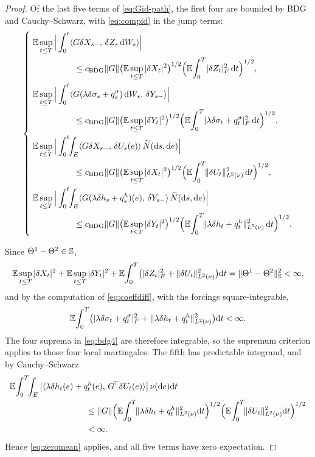 \begin{proof}
Of the last five terms of \eqref{eq:Gid-path}, the first four are bounded by BDG and
Cauchy--Schwarz, with \eqref{eq:compid} in the jump terms:
\begin{equation}\label{eq:bdg4}
\left\{\;
\begin{aligned}
&\E\sup_{t\le T}\Big|\int_0^t\inner{G\delta X_{s-}}{\delta Z_s\,\diff W_s}\Big|\\
&\hspace{0.14\linewidth}\le c_{\mathrm{BDG}}\|G\|\big(\E\sup_{t\le T}|\delta X_t|^2\big)^{1/2}
\Big(\E\!\int_0^T\!|\delta Z_t|_F^2\,\diff t\Big)^{1/2},\\
&\E\sup_{t\le T}\Big|\int_0^t\inner{G(\lambda\delta\sigma_s+q^\sigma_s)\,\diff W_s}{\delta Y_{s-}}\Big|\\
&\hspace{0.14\linewidth}\le c_{\mathrm{BDG}}\|G\|\big(\E\sup_{t\le T}|\delta Y_t|^2\big)^{1/2}
\Big(\E\!\int_0^T\!|\lambda\delta\sigma_t+q^\sigma_t|_F^2\,\diff t\Big)^{1/2},\\
&\E\sup_{t\le T}\Big|\int_0^t\!\!\int_E\inner{G\delta X_{s-}}{\delta U_s(e)}\,\Nt(\diff s,\diff e)\Big|\\
&\hspace{0.14\linewidth}\le c_{\mathrm{BDG}}\|G\|\big(\E\sup_{t\le T}|\delta X_t|^2\big)^{1/2}
\Big(\E\!\int_0^T\!\Lnorm{\delta U_t}^2\,\diff t\Big)^{1/2},\\
&\E\sup_{t\le T}\Big|\int_0^t\!\!\int_E\inner{G(\lambda\delta h_s+q^h_s)(e)}{\delta Y_{s-}}\,\Nt(\diff s,\diff e)\Big|\\
&\hspace{0.14\linewidth}\le c_{\mathrm{BDG}}\|G\|\big(\E\sup_{t\le T}|\delta Y_t|^2\big)^{1/2}
\Big(\E\!\int_0^T\!\Lnorm{\lambda\delta h_t+q^h_t}^2\,\diff t\Big)^{1/2} .
\end{aligned}
\right.
\end{equation}

Since $\Theta^1-\Theta^2\in\mathbb{S}$,
\[
\mathbb{E}\sup_{t\le T}|\delta X_t|^2+\mathbb{E}\sup_{t\le T}|\delta Y_t|^2
+\mathbb{E}\!\int_0^T\!\big(|\delta Z_t|_F^2+\lVert \delta U_t\rVert_{L^2(\nu)}^2\big)\mathrm{d} t
=\|\Theta^1-\Theta^2\|_{\mathbb{S}}^2<\infty ,
\]
and by the computation of \eqref{eq:coeffdiff}, with the forcings square-integrable,
\[
\mathbb{E}\!\int_0^T\!\big(|\lambda\delta\sigma_t+q^\sigma_t|_F^2
+\lVert \lambda\delta h_t+q^h_t\rVert_{L^2(\nu)}^2\big)\mathrm{d} t<\infty .
\]
The four suprema in \eqref{eq:bdg4} are therefore integrable, so the supremum criterion
applies to those four local martingales. The fifth has predictable
integrand, and by Cauchy--Schwarz
\[
\begin{aligned}
&\E\!\int_0^T\!\!\int_E\big|\inner{\lambda\delta h_t(e)+q^h_t(e)}{\Gstar\delta U_t(e)}\big|\,\nu(\diff e)\diff t\\
&\hspace{0.26\linewidth}\le\|G\|\Big(\E\!\int_0^T\!\Lnorm{\lambda\delta h_t+q^h_t}^2\diff t\Big)^{1/2}
\Big(\E\!\int_0^T\!\Lnorm{\delta U_t}^2\diff t\Big)^{1/2}\\
&\hspace{0.26\linewidth}<\infty .
\end{aligned}
\]
Hence \eqref{eq:zeromean} applies, and all five terms have zero expectation.


\end{proof}
